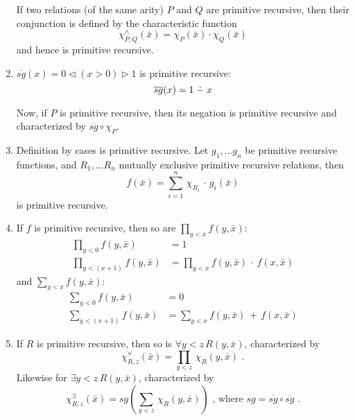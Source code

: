 \documentclass[a4paper,11pt]{article}
\newcommand{\dotmin}{\buildrel\textstyle.\over{\hbox{\vrule height3pt depth0pt width0pt}{\smash-}}}
\begin{document}
\begin{enumerate}
If two relations (of the same arity) $P$ and $Q$ are primitive recursive, then
their conjunction is defined by the characteristic function
\begin{equation*}
  \chi^{\wedge}_{P,Q}(\bar{x}) = \chi_{P}(\bar{x}) \cdot \chi_{Q}(\bar{x})
\end{equation*}
and hence is primitive recursive.


\item %
$\overline{sg}(x) = 0 \lhd (x > 0) \rhd 1$ is primitive recursive:
\begin{equation*}
  \overline{sg}(x) = 1 \dotmin x
\end{equation*}

Now, if $P$ is primitive recursive, then its negation is primitive recursive
and characterized by $\overline{sg} \circ \chi_P$.


\item %
Definition by cases is primitive recursive. Let $g_1, \ldots g_n$ be primitive
recursive functions, and $R_1, \ldots R_n$ mutually exclusive primitive
recursive relations, then
\begin{equation*}
  f(\bar{x}) = \sum^n_{i = 1} \, \chi_{R_i} \, \cdot \, g_i(\bar{x})
\end{equation*}
is primitive recursive.


\item %
If $f$ is primitive recursive, then so are $\prod_{y < x} f(y, \bar{x})$:
\begin{align*}
  \textstyle{\prod_{y < 0}} f(y, \bar{x})     &= 1\\
  \textstyle{\prod_{y < (x + 1)}} f(y, \bar{x}) &= \textstyle{\prod_{y < x}} f(y, \bar{x}) \, \cdot \, f(x, \bar{x})
\end{align*}
and $\sum_{y < x} f(y, \bar{x})$:
\begin{align*}
  \textstyle{\sum_{y < 0}} f(y, \bar{x})     &= 0\\
  \textstyle{\sum_{y < (x + 1)}} f(y, \bar{x}) &= \textstyle{\sum_{y < x}} f(y, \bar{x}) \, + \, f(x, \bar{x})
\end{align*}


\item %
If $R$ is primitive recursive, then so is $\forall y \! < \! z \, R(y, \bar{x})$, characterized by
\begin{equation*}
  \chi^{\forall}_{R,z}(\bar{x}) = \textstyle{\prod_{y < z}} \, \chi_R(y, \bar{x}) \text{ .}
\end{equation*}
Likewise for $\exists y \! < \! z \, R(y, \bar{x})$, characterized by
\begin{equation*}
  \chi^{\exists}_{R,z}(\bar{x}) = sg( \textstyle{\sum_{y < z}} \, \chi_R(y, \bar{x}) ) \text{ , where } sg = \overline{sg} \circ \overline{sg} \text{ .}
\end{equation*}


\end{enumerate}
\end{document}

